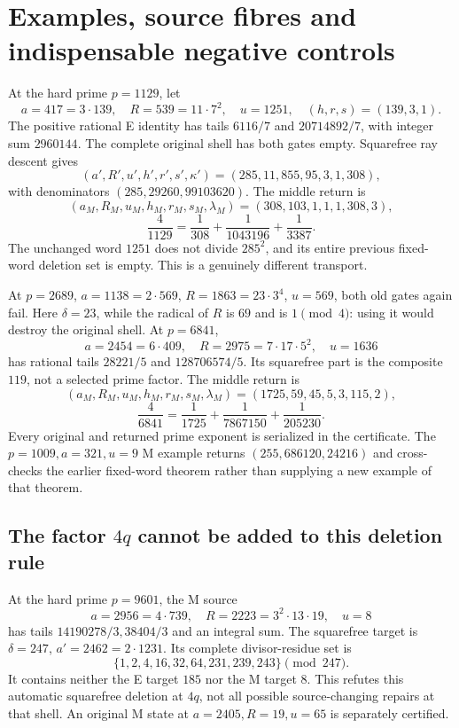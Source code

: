 \section{Examples, source fibres and indispensable negative controls}\label{sec:examples}
At the hard prime $p=1129$, let
\[
 a=417=3\cdot139,\quad R=539=11\cdot7^2,\quad u=1251,
 \quad(h,r,s)=(139,3,1).
\]
The positive rational E identity has tails $6116/7$ and $20714892/7$, with
integer sum $2960144$. The complete original shell has both gates empty.
Squarefree ray descent gives
\[
 (a',R',u',h',r',s',\kappa')=(285,11,855,95,3,1,308),
\]
with denominators $(285,29260,99103620)$. The middle return is
\[
 (a_M,R_M,u_M,h_M,r_M,s_M,\lambda_M)
 =(308,103,1,1,1,308,3),
\]
\[
 \frac4{1129}=\frac1{308}+\frac1{1043196}+\frac1{3387}.
\]
The unchanged word $1251$ does not divide $285^2$, and its entire previous
fixed-word deletion set is empty. This is a genuinely different transport.

At $p=2689$, $a=1138=2\cdot569$, $R=1863=23\cdot3^4$, $u=569$, both old
gates again fail. Here $\delta=23$, while the radical of $R$ is $69$ and
is $1\pmod4$: using it would destroy the original shell. At $p=6841$,
\[
 a=2454=6\cdot409,\quad R=2975=7\cdot17\cdot5^2,\quad u=1636
\]
has rational tails $28221/5$ and $128706574/5$. Its squarefree part is the
composite $119$, not a selected prime factor. The middle return is
\[
 (a_M,R_M,u_M,h_M,r_M,s_M,\lambda_M)=(1725,59,45,5,3,115,2),
\]
\[
 \frac4{6841}=\frac1{1725}+\frac1{7867150}+\frac1{205230}.
\]
Every original and returned prime exponent is serialized in the certificate.
The $p=1009,a=321,u=9$ M example returns $(255,686120,24216)$ and cross-checks
the earlier fixed-word theorem rather than supplying a new example of that theorem.

\subsection{The factor \texorpdfstring{$4q$}{4q} cannot be added to this deletion rule}
At the hard prime $p=9601$, the M source
\[
 a=2956=4\cdot739,\quad R=2223=3^2\cdot13\cdot19,\quad u=8
\]
has tails $14190278/3,38404/3$ and an integral sum. The squarefree target is
$\delta=247$, $a'=2462=2\cdot1231$. Its complete divisor-residue set is
\[
 \{1,2,4,16,32,64,231,239,243\}\pmod{247}.
\]
It contains neither the E target $185$ nor the M target $8$. This refutes
this automatic squarefree deletion at $4q$, not all possible source-changing
repairs at that shell. An original M state at $a=2405,R=19,u=65$ is separately
certified.

